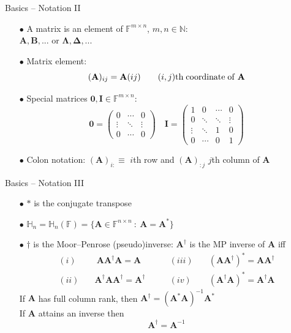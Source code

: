 \documentclass{beamer}
\newcommand{\bgk}[1]{\boldsymbol{#1}}
\newcommand{\bzero}{\bgk{0}}
\newcommand{\bDelta}{\bgk{\Delta}}
\newcommand{\bLambda}{\bgk{\Lambda}}
\newcommand{\bvec}[1]{\mathbf{#1}}
\newcommand{\vA}{\bvec{A}}
\newcommand{\vB}{\bvec{B}}
\newcommand{\vI}{\bvec{I}}
\begin{document}
\begin{frame}{Basics -- Notation II}

\begin{itemize}
    \item[$\bullet$] A matrix is an element of $\mathbb{F}^{m\times n}$, $m, n\in\mathbb{N}$:\\
    $\vA, \vB, ...$ or $\bLambda, \bDelta, ...$
    \item[$\bullet$] Matrix element:
    $$
    (\vA)_{ij} = \vA({ij}) \qquad (i,j)\rm{th\;coordinate\;of\; \vA}  
    $$
    \item[$\bullet$] Special matrices $\bzero, \vI \in \mathbb{F}^{m\times n}$:
    $$
    \bzero = 
    \begin{pmatrix}
    0       & \cdots    & 0 \\
    \vdots  & \ddots    & \vdots\\
    0       & \cdots    & 0
    \end{pmatrix}
    \quad
    \vI = 
    \begin{pmatrix}
    1       & 0         & \cdots    & 0 \\
    0       & \ddots    & \ddots    & \vdots\\
    \vdots  & \ddots    &  1        & 0\\
    0       & \cdots    & 0         & 1
    \end{pmatrix}
    $$
    \item[$\bullet$] Colon notation: 
    $(\vA)_{i:}\equiv$ $i$th row and $(\vA)_{:j}$ $j$th column of $\vA$
\end{itemize}
\end{frame}

\begin{frame}{Basics -- Notation III}
\begin{itemize}
    \item[$\bullet$] $*$ is the conjugate transpose
    \item[$\bullet$] $\mathbb{H}_n = \mathbb{H}_n(\mathbb{F}) = \{ \vA\in\mathbb{F}^{n\times n}~:~ \vA = \vA^* \}$
    \item[$\bullet$] $\dagger$ is the Moor--Penrose (pseudo)inverse: 
    $\vA^\dagger$ is the MP inverse of $\vA$ iff
    \begin{equation*}
    \begin{aligned}
    (i)&\quad  ~\vA\vA^\dagger\vA = \vA \qquad &(iii)&\quad  (\vA\vA^\dagger)^* = \vA\vA^\dagger\\
    (ii)&\quad \vA^\dagger\vA\vA^\dagger = \vA^\dagger \qquad &(iv)&\quad (\vA^\dagger\vA)^* = \vA^\dagger\vA
    \end{aligned}
    \end{equation*}
    If $\vA$ has full column rank, then  $\vA^\dagger = (\vA^* \vA)^{-1} \vA^*$\\
    If $\vA$ attains an inverse then
    $$
    \vA^\dagger = \vA^{-1}
    $$
\end{itemize}

\end{frame}
\end{document}
